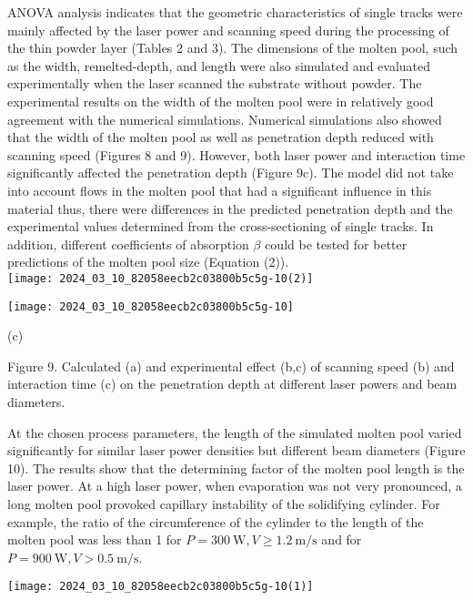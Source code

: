 \documentclass[10pt]{article}
\begin{document}
ANOVA analysis indicates that the geometric characteristics of single tracks were mainly affected by the laser power and scanning speed during the processing of the thin powder layer (Tables 2 and 3). The dimensions of the molten pool, such as the width, remelted-depth, and length were also simulated and evaluated experimentally when the laser scanned the substrate without powder. The experimental results on the width of the molten pool were in relatively good agreement with the numerical simulations. Numerical simulations also showed that the width of the molten pool as well as penetration depth reduced with scanning speed (Figures 8 and 9). However, both laser power and interaction time significantly affected the penetration depth (Figure 9c). The model did not take into account flows in the molten pool that had a significant influence in this material thus, there were differences in the predicted penetration depth and the experimental values determined from the cross-sectioning of single tracks. In addition, different coefficients of absorption $\beta$ could be tested for better predictions of the molten pool size (Equation (2)).\\
\texttt{[image: 2024\_03\_10\_82058eecb2c03800b5c5g-10(2)]}

\begin{center}
\texttt{[image: 2024\_03\_10\_82058eecb2c03800b5c5g-10]}
\end{center}

(c)

Figure 9. Calculated (a) and experimental effect (b,c) of scanning speed (b) and interaction time (c) on the penetration depth at different laser powers and beam diameters.

At the chosen process parameters, the length of the simulated molten pool varied significantly for similar laser power densities but different beam diameters (Figure 10). The results show that the determining factor of the molten pool length is the laser power. At a high laser power, when evaporation was not very pronounced, a long molten pool provoked capillary instability of the solidifying cylinder. For example, the ratio of the circumference of the cylinder to the length of the molten pool was less than 1 for $P=300 \mathrm{~W}, V \geq 1.2 \mathrm{~m} / \mathrm{s}$ and for $P=900 \mathrm{~W}, V>0.5 \mathrm{~m} / \mathrm{s}$.

\begin{center}
\texttt{[image: 2024\_03\_10\_82058eecb2c03800b5c5g-10(1)]}
\end{center}
\end{document}
